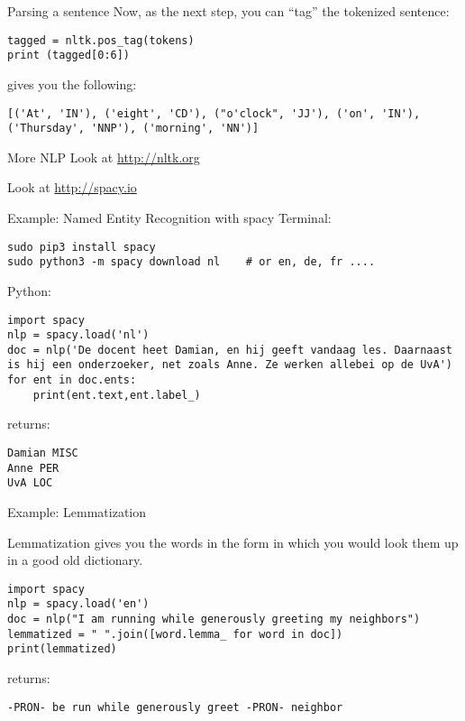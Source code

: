 \documentclass[compress]{beamer}
\begin{document}
\begin{frame}[fragile]{Parsing a sentence}
Now, as the next step, you can ``tag'' the tokenized sentence:
\begin{lstlisting}
tagged = nltk.pos_tag(tokens)
print (tagged[0:6])
\end{lstlisting}
gives you the following:
\begin{lstlisting}
[('At', 'IN'), ('eight', 'CD'), ("o'clock", 'JJ'), ('on', 'IN'),
('Thursday', 'NNP'), ('morning', 'NN')]
\end{lstlisting}


\end{frame}


\begin{frame}{More NLP}
\Huge{Look at \url{http://nltk.org}}

\Huge{Look at \url{http://spacy.io}}

\end{frame}



\begin{frame}[fragile]{Example: Named Entity Recognition with spacy}
Terminal:

\begin{lstlisting}
sudo pip3 install spacy
sudo python3 -m spacy download nl    # or en, de, fr ....
\end{lstlisting}

Python:

\begin{lstlisting}
import spacy
nlp = spacy.load('nl')
doc = nlp('De docent heet Damian, en hij geeft vandaag les. Daarnaast is hij een onderzoeker, net zoals Anne. Ze werken allebei op de UvA')
for ent in doc.ents:
    print(ent.text,ent.label_)
\end{lstlisting}

returns:

\begin{lstlisting}
Damian MISC
Anne PER
UvA LOC
\end{lstlisting}  

\end{frame}



\begin{frame}[fragile]{Example: Lemmatization}

Lemmatization gives you the words in the form in which you would look them up in a good old dictionary.

\begin{lstlisting}
import spacy
nlp = spacy.load('en')
doc = nlp("I am running while generously greeting my neighbors")
lemmatized = " ".join([word.lemma_ for word in doc])
print(lemmatized)
\end{lstlisting}

returns:

\begin{lstlisting}
-PRON- be run while generously greet -PRON- neighbor
\end{lstlisting}  

\end{frame}
\end{document}
